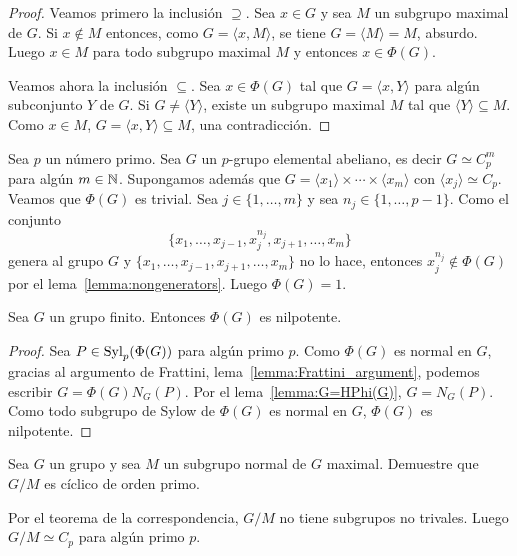 \begin{proof}
	Veamos primero la inclusión $\supseteq$.  Sea $x\in G$ y sea $M$ un
	subgrupo maximal de $G$.  Si $x\not\in M$ entonces, como $G=\langle
	x,M\rangle$, se tiene $G=\langle M\rangle=M$, absurdo. Luego $x\in M$ para
	todo subgrupo maximal $M$ y entonces $x\in \Phi(G)$. 

	Veamos ahora la inclusión $\subseteq$. Sea $x\in\Phi(G)$ tal que $G=\langle
	x,Y\rangle$ para algún subconjunto $Y$ de $G$. Si $G\ne \langle Y\rangle$,
	existe un subgrupo maximal $M$ tal que $\langle Y\rangle\subseteq M$. Como
	$x\in M$, $G=\langle x,Y\rangle\subseteq M$, una contradicción.
\end{proof}

\begin{example}
	Sea $p$ un número primo. Sea $G$ un $p$-grupo elemental abeliano, es decir
	$G\simeq C_p^m$ para algún $m\in\mathbb{N}$.  Supongamos además que
	$G=\langle x_1\rangle\times\cdots\times\langle x_m\rangle$ con $\langle x_j\rangle\simeq C_p$.  
	Veamos que $\Phi(G)$ es trivial. 
	Sea $j\in\{1,\dots,m\}$ y sea $n_j\in\{1,\dots,p-1\}$. Como el conjunto
	\[
	\{x_1,\dots,x_{j-1},x_j^{n_j},x_{j+1},\dots,x_m\}
	\]
	genera al grupo $G$ y $\{x_1,\dots,x_{j-1},x_{j+1},\dots,x_m\}$ no lo hace,
	entonces $x_j^{n_j}\not\in\Phi(G)$ por el lema~\ref{lemma:nongenerators}.
	Luego $\Phi(G)=1$.
\end{example}

\begin{theorem}[Frattini]
	\label{theorem:Frattini}
	Sea $G$ un grupo finito. Entonces $\Phi(G)$ es nilpotente.
\end{theorem}

\begin{proof}
	Sea $P\in\mathrm{Syl}_p(\Phi(G))$ para algún primo $p$. Como $\Phi(G)$ es normal en
	$G$, gracias al argumento de Frattini, lema~\ref{lemma:Frattini_argument},
	podemos escribir $G=\Phi(G)N_G(P)$. Por el lema~\ref{lemma:G=HPhi(G)},
	$G=N_G(P)$. Como todo subgrupo de Sylow de $\Phi(G)$ es normal en $G$,
	$\Phi(G)$ es nilpotente.
\end{proof}

\begin{exercise}
	\label{exercise:G/M}
	Sea $G$ un grupo y sea $M$ un subgrupo normal de $G$ maximal. Demuestre que
	$G/M$ es cíclico de orden primo. 
\end{exercise}

\begin{svgraybox}
	Por el teorema de la correspondencia, $G/M$ no tiene subgrupos no trivales.
	Luego $G/M\simeq C_p$ para algún primo $p$.
\end{svgraybox}

